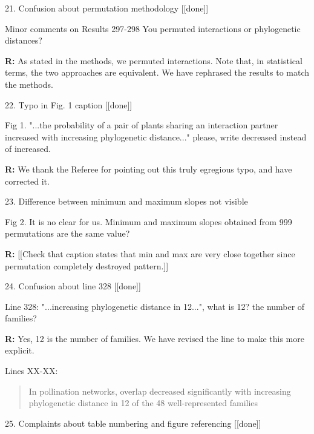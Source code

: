 \documentclass[12pt]{letter}
\newenvironment{refquote}{\bigskip \begin{it}}{\end{it}\smallskip}
\begin{document}
	21. Confusion about permutation methodology [[done]]

		\begin{refquote}
			Minor comments on Results
			297-298 You permuted interactions or phylogenetic distances?
		\end{refquote}


		\textbf{R:} As stated in the methods, we permuted interactions. Note that, in statistical terms, the two approaches are equivalent. We have rephrased the results to match the methods.


	22. Typo in Fig. 1 caption [[done]]

		\begin{refquote}
			Fig 1. "...the probability of a pair of plants sharing an interaction partner increased with increasing phylogenetic distance..." please, write decreased instead of increased.
		\end{refquote}


		\textbf{R:} We thank the Referee for pointing out this truly egregious typo, and have corrected it.


	23. Difference between minimum and maximum slopes not visible

		\begin{refquote}
			Fig 2. It is no clear for us. Minimum and maximum slopes obtained from 999 permutations are the same value?
		\end{refquote}


		\textbf{R:} [[Check that caption states that min and max are very close together since permutation completely destroyed pattern.]]


	24. Confusion about line 328 [[done]]

		\begin{refquote}
			Line  328: "...increasing phylogenetic distance in 12...", what is 12? the number of families?
		\end{refquote}

		\textbf{R:} Yes, 12 is the number of families. We have revised the line to make this more explicit.


		Lines XX-XX: 


		\begin{quotation}

		In pollination networks, overlap decreased significantly with increasing phylogenetic distance in 12 of the 48 well-represented families

		\end{quotation}


	25. Complaints about table numbering and figure referencing [[done]]
\end{document}
